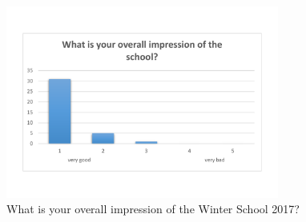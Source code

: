 \documentclass[11pt,a4paper]{article}
\numberwithin{equation}{section}
\numberwithin{table}{section}\setlength{\multlinegap}{25pt}
\begin{document}
\begin{figure}[H]
\centering
\includegraphics[width=0.8\textwidth]{eval/general/overall_impression.pdf}
\caption{What is your overall impression of the Winter School 2017?}
\end{figure}
\end{document}

